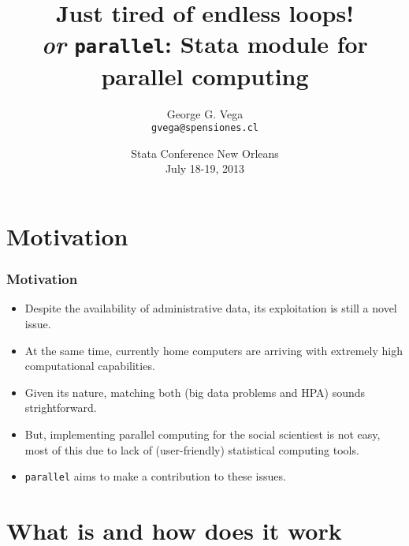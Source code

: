 \documentclass[9pt]{beamer}
\title[{\tt parallel}]{Just tired of endless loops! \\ {\it \footnotesize or} {\normalsize {\tt parallel}: Stata module for parallel computing}}
\author[GGV]{George G. Vega\\ {\tt \scriptsize gvega@spensiones.cl}}
\institute[SPensiones]{Chilean Pension Supervisor}
\date{Stata Conference New Orleans\\July 18-19, 2013}
\begin{document}


\section{Motivation}

\begin{frame} %
\frametitle{Motivation}
\begin{itemize}
\item Despite the availability of administrative data, its exploitation is still a novel issue.\pause
\item At the same time, currently home computers are arriving with extremely high computational capabilities.\pause
\item Given its nature, matching both (big data problems and HPA) sounds strightforward.\pause
\item But, implementing parallel computing for the social scientiest is not easy,
\pause most of this due to lack of (user-friendly) statistical computing tools.\pause
\item {\tt parallel} aims to make a contribution to these issues.
\end{itemize}
\end{frame}

\section{What is and how does it work}

\frame{\tableofcontents[currentsection]}
\end{document}
